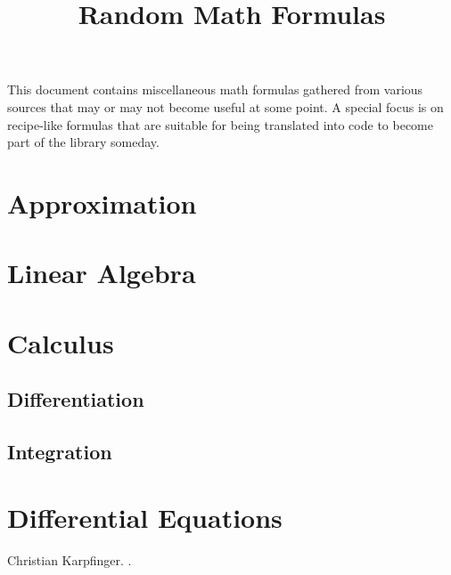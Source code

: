 \documentclass[12pt]{article}
\begin{document}
	
\parindent=0in
\parskip=0pt
		
 \setcounter{page}{1}

\title{Random Math Formulas}
\maketitle

\section{}
This document contains miscellaneous math formulas gathered from various sources that may or may not become useful at some point. A special focus is on recipe-like formulas that are suitable for being translated into code to become part of the library someday.

\tableofcontents



\section{Approximation}


\section{Linear Algebra}

\section{Calculus}
\subsection{Differentiation}
\subsection{Integration}

\section{Differential Equations}



\begin{thebibliography}{10}
Christian Karpfinger. .
\end{thebibliography}	

 
  
	
\end{document}
